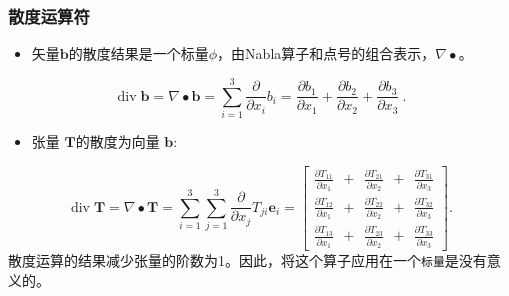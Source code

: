 \documentclass[LBMDerivation.tex]{subfiles}
\begin{document}
\subsubsection{散度运算符}
%
%
\begin{itemize}
    \item 矢量$\textbf{b}$的散度结果是一个标量$\phi$，由Nabla算子和点号的组合表示，$\nabla \bullet$。
\end{itemize}
%
%
\begin{equation}
 \operatorname{div} \textbf{b} = \nabla \bullet \textbf{b} = \sum_{i=1}^{3} \frac{\partial}{\partial x_i} b_i
=
  \frac{\partial b_1}{\partial x_1} + \frac{\partial b_2}{\partial x_2} + \frac{\partial b_3}{\partial x_3} ~.
  \label{EQUATION::divVector}
\end{equation}
%
%
\begin{itemize}
    \item 张量 $\textbf{T}$的散度为向量 $\textbf{b}$:
\end{itemize}
%
%
\begin{equation}
  \operatorname{div} \textbf{T} = \nabla \bullet \textbf{T}
=
  \sum_{i=1}^{3}\sum_{j=1}^{3} \frac{\partial}{\partial x_j} T_{ji} \textbf{e}_i
=
  \left[
  \begin{matrix}
   \frac{\partial T_{11}}{\partial x_1} ~ ~ + ~ ~ \frac{\partial T_{21}}{\partial x_2} ~ ~ + ~ ~ \frac{\partial T_{31}}{\partial x_3} \\
   \frac{\partial T_{12}}{\partial x_1} ~ ~ + ~ ~ \frac{\partial T_{22}}{\partial x_2} ~ ~ + ~ ~ \frac{\partial T_{32}}{\partial x_3} \\
   \frac{\partial T_{13}}{\partial x_1} ~ ~ + ~ ~ \frac{\partial T_{23}}{\partial x_2} ~ ~ + ~ ~ \frac{\partial T_{33}}{\partial x_3}
  \end{matrix}
  \right] .
  \label{EQUATION::divTensor}
\end{equation}
%
%
    散度运算的结果$\textit{减少}$张量的阶数为1。因此，将这个算子应用在一个\texttt{标量}是没有意义的。
%
%
%
%
\end{document}
